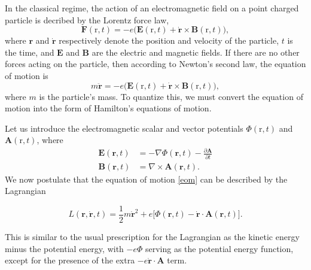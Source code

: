 \documentclass[pra,12pt]{revtex4}
\begin{document}
In the classical regime, the action of an electromagnetic field on a
point charged particle is decribed by the Lorentz force law,
\begin{equation}
  \mathbf{F}(\mathrm{r},t) = -e\Big(\mathbf{E}(\mathrm{r},t)
  + \dot{\mathbf{r}}\times \mathbf{B}(\mathrm{r},t)\Big),
\end{equation}
where $\mathbf{r}$ and $\dot{\mathbf{r}}$ respectively denote the
position and velocity of the particle, $t$ is the time, and
$\mathbf{E}$ and $\mathbf{B}$ are the electric and magnetic fields.
If there are no other forces acting on the particle, then according to
Newton's second law, the equation of motion is
\begin{equation}
  m\ddot{\mathbf{r}} = -e\Big(\mathbf{E}(\mathrm{r},t)
  + \dot{\mathbf{r}} \times \mathbf{B}(\mathrm{r},t)\Big),
  \label{eom}
\end{equation}
where $m$ is the particle's mass.  To quantize this, we must convert
the equation of motion into the form of Hamilton's equations of
motion.

Let us introduce the electromagnetic scalar and vector potentials
$\Phi(\mathrm{r},t)$ and $\mathbf{A}(\mathrm{r},t)$, where
\begin{align}
  \mathbf{E}(\mathbf{r},t) &= - \nabla \Phi(\mathbf{r},t) - \frac{\partial\mathbf{A}}{\partial t} \\
  \mathbf{B}(\mathbf{r},t) &= \nabla \times \mathbf{A}(\mathbf{r},t).
  \label{Bfield}
\end{align}
We now postulate that the equation of motion \eqref{eom} can be
described by the Lagrangian
\begin{framed}
\begin{equation}
  L(\mathbf{r},\dot{\mathbf{r}},t) = \frac{1}{2}m\dot{\mathbf{r}}^2
  + e \Big[\Phi(\mathbf{r},t) - \dot{\mathbf{r}} \cdot \mathbf{A}(\mathbf{r},t)
    \Big].
  \label{Lag}
\end{equation}
\end{framed}
\vskip -0.15in
\noindent
This is similar to the usual prescription for the Lagrangian as the
kinetic energy minus the potential energy, with $-e\Phi$ serving as
the potential energy function, except for the presence of the extra
$-e\dot{\mathbf{r}} \cdot \mathbf{A}$ term.
\end{document}
